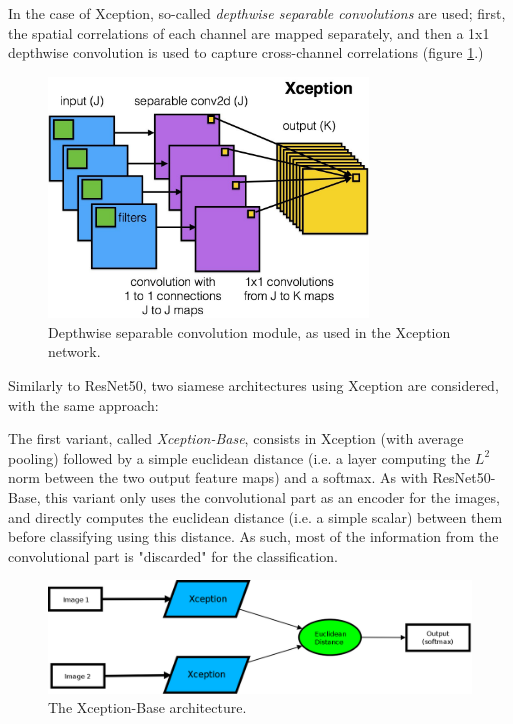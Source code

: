 \documentclass[11pt]{report}
\begin{document}
In the case of Xception, so-called \emph{depthwise separable convolutions} are used; first, the spatial correlations of each channel are mapped separately, and then a 1x1 depthwise convolution is used to capture cross-channel correlations (figure \ref{xception_module}.)\newline

\begin{figure}[H]
\centering\includegraphics[width=8.5cm]{xception_module.jpg}
\caption{Depthwise separable convolution module, as used in the Xception network.}
\label{xception_module}
\end{figure}

Similarly to ResNet50, two siamese architectures using Xception are considered, with the same approach:\newline

The first variant, called \emph{Xception-Base}, consists in Xception (with average pooling) followed by a simple euclidean distance (i.e. a layer computing the $L^2$ norm between the two output feature maps) and a softmax. As with ResNet50-Base, this variant only uses the convolutional part as an encoder for the images, and directly computes the euclidean distance (i.e. a simple scalar) between them before classifying using this distance. As such, most of the information from the convolutional part is "discarded" for the classification.

\begin{figure}[H]
\centering\includegraphics[width=13cm]{diaxcepbase.png}
\caption{The Xception-Base architecture.}
\label{xcepbase}
\end{figure}
\end{document}
